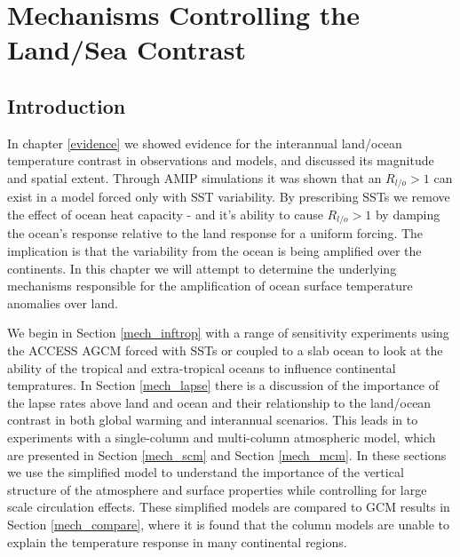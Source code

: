 \chapter{Mechanisms Controlling the Land/Sea Contrast} 


\label{mechanisms} 


\section{Introduction}
In chapter \ref{evidence} we showed evidence for the interannual land/ocean 
temperature contrast in observations and models, and discussed its magnitude and 
spatial extent. Through AMIP simulations it was shown that an $R_{l/o}>1$ can 
exist in a model forced only with SST variability. By prescribing SSTs we remove 
the effect of ocean heat capacity - and it's ability to cause $R_{l/o}>1$ by 
damping the ocean's response relative to the land response for a uniform 
forcing. The implication is that the variability from the ocean is being 
amplified over the continents. In this chapter we will attempt to determine the 
underlying mechanisms responsible for the amplification of ocean surface 
temperature anomalies over land. 

We begin in Section \ref{mech_inftrop} with a range of sensitivity experiments 
using the ACCESS AGCM forced with SSTs or coupled to a slab ocean to look at the 
ability of the tropical and extra-tropical oceans to influence continental 
tempratures. In Section \ref{mech_lapse} there is a discussion of the importance 
of the lapse rates above land and ocean and their relationship to the land/ocean 
contrast in both global warming and interannual scenarios. This leads in to 
experiments with a single-column and multi-column atmospheric model, which are 
presented in Section \ref{mech_scm} and Section \ref{mech_mcm}. In these 
sections we use the simplified model to understand the importance of the 
vertical structure of the atmosphere and surface properties while controlling 
for large scale circulation effects. These simplified models are compared to GCM 
results in Section \ref{mech_compare}, where it is found that the column models 
are unable to explain the temperature response in many continental regions.

